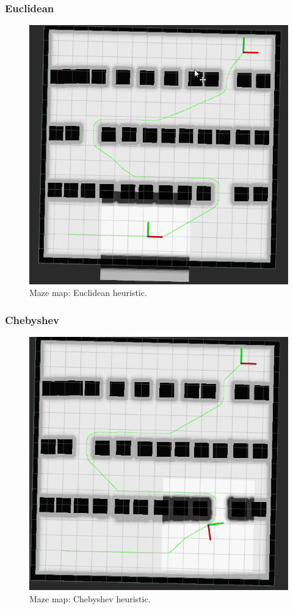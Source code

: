 \documentclass{article}
\begin{document}
\subsubsection*{Euclidean}
\begin{figure}[!ht]
    \centering
    \includegraphics[width=0.9\columnwidth]{../images/euclidian_maze_corridor.png}
    \caption{Maze map: Euclidean heuristic.}
    \label{fig:euclidean_maze}
\end{figure}
\clearpage

\subsubsection*{Chebyshev}
\begin{figure}[!ht]
    \centering
    \includegraphics[width=0.9\columnwidth]{../images/chebyshecv_maze_corridor.png}
    \caption{Maze map: Chebyshev heuristic.}
    \label{fig:chebyshev_maze}
\end{figure}
\end{document}
